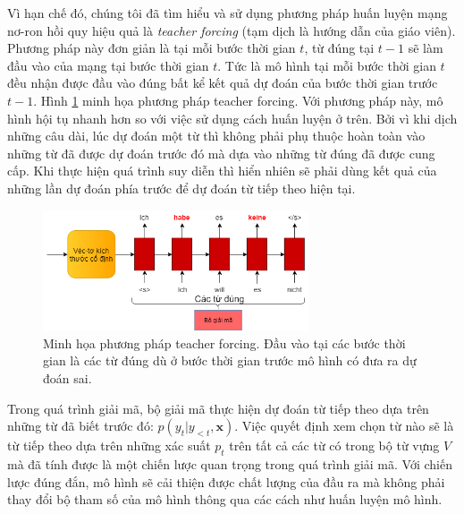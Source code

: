 Vì hạn chế đó, chúng tôi đã tìm hiểu và sử dụng phương pháp huấn luyện mạng nơ-ron hồi quy hiệu quả là \textit{teacher forcing} (tạm dịch là hướng dẫn của giáo viên). Phương pháp này đơn giản là tại mỗi bước thời gian $t$, từ đúng tại $t-1$ sẽ làm đầu vào của mạng tại bước thời gian $t$. Tức là mô hình tại mỗi bước thời gian $t$ đều nhận được đầu vào đúng bất kể kết quả dự đoán của bước thời gian trước $t-1$. Hình \ref{fig_Teacher-forcing} minh họa phương pháp teacher forcing. Với phương pháp này, mô hình hội tụ nhanh hơn so với việc sử dụng cách huấn luyện ở trên. Bởi vì khi dịch những câu dài, lúc dự đoán một từ thì không phải phụ thuộc hoàn toàn vào những từ đã được dự đoán trước đó mà dựa vào những từ đúng đã được cung cấp. Khi thực hiện quá trình suy diễn thì hiển nhiên sẽ phải dùng kết quả của những lần dự đoán phía trước để dự đoán từ tiếp theo hiện tại. 

\begin{figure}
	\centering
	\includegraphics[width=0.7\textwidth]{Teacher-forcing.png}
	\caption[Minh họa phương pháp teacher forcing.]{Minh họa phương pháp teacher forcing. Đầu vào tại các bước thời gian là các từ đúng dù ở bước thời gian trước mô hình có đưa ra dự đoán sai.}
	\label{fig_Teacher-forcing}
\end{figure}

Trong quá trình giải mã, bộ giải mã thực hiện dự đoán từ tiếp theo dựa trên những từ đã biết trước đó: $p(y_t | y_{<t}, \bm{x})$. Việc quyết định xem chọn từ nào sẽ là từ tiếp theo dựa trên những xác suất $p_t$ trên tất cả các từ có trong bộ từ vựng $V$ mà đã tính được là một chiến lược quan trọng trong quá trình giải mã. Với chiến lược đúng đắn, mô hình sẽ cải thiện được chất lượng của đầu ra mà không phải thay đổi bộ tham số của mô hình thông qua các cách như huấn luyện mô hình.

